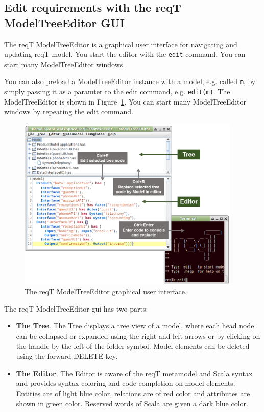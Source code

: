 \documentclass[11pt]{article}
\begin{document}
\subsection{Edit requirements with the reqT ModelTreeEditor GUI}

The reqT ModelTreeEditor is a graphical user interface for navigating and updating reqT model. You start the editor with the \verb+edit+ command. You can start many ModelTreeEditor windows. 

You can also preload a ModelTreeEditor instance with a model, e.g. called \verb+m+, by simply passing it as a paramter to the edit command, e.g. \verb+edit(m)+. The ModelTreeEditor is shown in Figure~\ref{fig:gui}. You can start many ModelTreeEditor windows by repeating the edit command.

\begin{figure}[h]
    \centering
    \includegraphics[width=0.95\textwidth]{gui.png}
    \caption{The reqT ModelTreeEditor graphical user interface.}
    \label{fig:gui}
\end{figure}

The reqT ModelTreeEditor gui has two parts:
\begin{itemize}
\item {\bf The Tree}. The Tree displays a tree view of a model, where each head node can be collapsed or expanded using the right and left arrows or by clicking on the handle by the left of the folder symbol. Model elements can be deleted using the forward DELETE key.
\item {\bf The Editor}. The Editor is aware of the reqT metamodel and Scala syntax and provides syntax coloring and code completion on model elements. Entities are of light blue color, relations are of red color and attributes are shown in green color. Reserved words of Scala are given a dark blue color.
\end{itemize}
\end{document}
